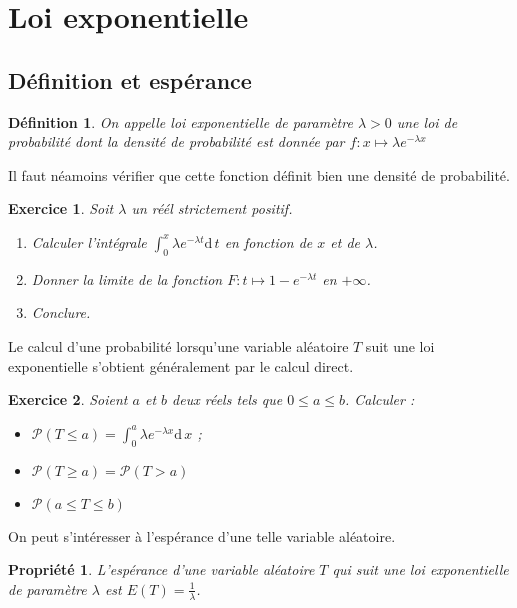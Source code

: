 \documentclass[11pt,a4paper,french]{article}
\newcommand{\diff}[1]{\mathrm{d}\,#1}
\newcommand{\p}{\mathcal{P}}
\theoremstyle{break}
\newtheorem{definition}{Définition}
\newtheorem{propriete}{Propriété}
\theoremstyle{plain}
\newtheorem{exerciceT}{Exercice}
\theoremstyle{nonumberplain}
\theoremstyle{nonumberbreak}
\newenvironment{exercice}{\begin{framed}\begin{exerciceT}}{\end{exerciceT}\end{framed}}
\begin{document}
\section{Loi exponentielle}

\subsection{Définition et espérance}

\begin{definition}
  On appelle \emph{loi exponentielle} de paramètre $\lambda>0$ une loi
  de probabilité dont la densité de probabilité est donnée par
  $f:x\mapsto \lambda e^{-\lambda x}$
\end{definition}

Il faut néamoins vérifier que cette fonction définit bien une densité de
probabilité.

\begin{exercice}
  Soit $\lambda$ un réél strictement positif.
  \begin{enumerate}
    \item Calculer l'intégrale $\int_0^x \lambda e^{-\lambda t} \diff t$
      en fonction de $x$ et de $\lambda$.
    \item Donner la limite de la fonction $F:t \mapsto 1 - e^{-\lambda
      t}$ en $+\infty$.
    \item Conclure.
  \end{enumerate}
\end{exercice}

Le calcul d'une probabilité lorsqu'une variable aléatoire $T$ suit une
loi exponentielle s'obtient généralement par le calcul direct.

\begin{exercice}
  Soient $a$ et $b$ deux réels tels que $0\leqslant a \leqslant b$.
  Calculer :
  \begin{itemize}
    \item $\p(T \leqslant a) = \int_0^a \lambda e^{-\lambda x} \diff x$ ;
    \item $\p(T \geqslant a) = \p(T > a )$
    \item $\p(a \leqslant T \leqslant b)$
  \end{itemize}
\end{exercice}

On peut s'intéresser à l'espérance d'une telle variable aléatoire.

\begin{propriete}
  L'espérance d'une variable aléatoire $T$ qui suit une loi
  exponentielle de paramètre $\lambda$ est $E(T) = \frac1{\lambda}$.
\end{propriete}
\end{document}
